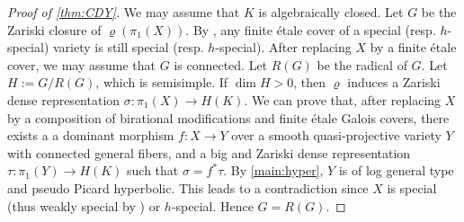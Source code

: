 \documentclass[english]{amsproc}
\theoremstyle{plain}
\theoremstyle{definition}
\theoremstyle{remark}
\theoremstyle{plain}
\numberwithin{equation}{thm} %
\begin{document}
	\begin{proof}[Proof of  \cref{thm:CDY}]
	 	We may assume that $K$ is algebraically closed.  Let $G$ be the Zariski closure of $\varrho(\pi_1(X))$.  By \cite{Cam11}, any finite \'etale cover of a   special (resp. $h$-special) variety is still  special (resp. $h$-special).   After replacing $X$ by a  finite étale cover,  we may assume that $G$ is connected. Let $R(G)$ be the radical of $G$. Let $H:=G/R(G)$, which is semisimple.  If $\dim H>0$,  then $\varrho$ induces a Zariski dense representation $\sigma: \pi_1(X)\to H(K)$.  %
	 	  We can prove that, after replacing $X$ by a composition of birational modifications and  finite étale Galois covers,  there exists a   a dominant morphism $f:X\to Y$ over  a smooth quasi-projective variety $Y$  with connected general fibers, and  a big and Zariski dense representation $\tau:\pi_1(Y)\to H(K)$ such that $\sigma=f^*\tau$.  By \cref{main:hyper}, $Y$ is of log general type and pseudo Picard hyperbolic.  
		This leads to a contradiction since $X$ is special (thus weakly special by \cite{Cam11}) or $h$-special. Hence $G=R(G)$. 
		
		\medspace
		

\end{proof}
\end{document}

